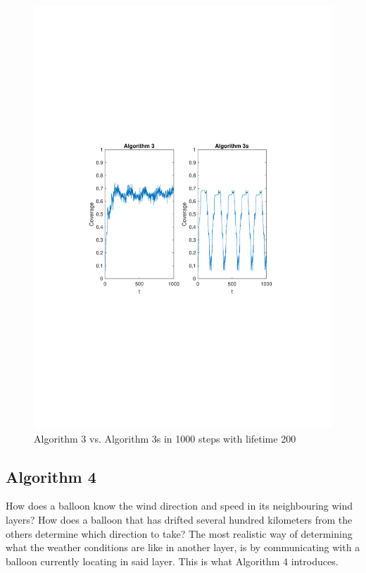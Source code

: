 \begin{figure}
\centering
\includegraphics[scale=0.7, trim={3cm 10cm 4cm 9cm},clip]{graphics/coverage_alg3_vs_alg3s_1000steps_LIFETIME200.pdf}
\caption{Algorithm 3 vs. Algorithm 3s in 1000 steps with lifetime 200}
\label{fig:alg3vsalg3s_200}
\end{figure}


\subsection{Algorithm 4}
How does a balloon know the wind direction and speed in its neighbouring wind layers? How does a balloon that has drifted several hundred kilometers from the others determine which direction to take? The most realistic way of determining what the weather conditions are like in another layer, is by communicating with a balloon currently locating in said layer. This is what Algorithm 4 introduces. 

